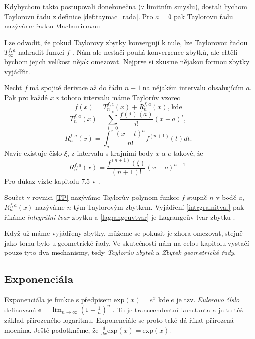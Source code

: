 \begin{remind}
Kdybychom takto postupovali donekonečna (v limitním smyslu), dostali bychom Taylorovu řadu z definice \ref{def:taymac_rada}. Pro $a=0$ pak Taylorovu řadu nazýváme řadou Maclaurinovou.
\end{remind}

Lze odvodit, že pokud Taylorovy zbytky konvergují k nule, lze Taylorovou řadou $T_\infty^{f,a}$ nahradit funkci $f$ \cite{ZDVNNR}. Nám ale nestačí pouhá konvergence zbytků, ale chtěli bychom jejich velikost nějak omezovat. Nejprve si zkusme nějakou formou zbytky vyjádřit.

\begin{fact}
Nechť $f$ má spojité derivace až do řádu $n+1$ na nějakém intervalu obsahujícím $a$. Pak pro každé $x$ z tohoto intervalu máme Taylorův vzorec
\begin{equation}
f(x) = T_n^{f,a}(x) + R_n^{f,a}(x)\text{, kde}
\end{equation}
\begin{equation}\label{TP}
T_n^{f,a}(x) = \sum_{i=0}^{n}\frac{f{(i)}(a)}{i!}(x-a)^i,
\end{equation}
\begin{equation}\label{integralnitvar}
R_n^{f,a}(x)=\int_a^x\frac{(x-t)^n}{n!}f^{(n+1)}(t)dt.
\end{equation}
Navíc existuje číslo $\xi$, z intervalu s krajními body $x$ a $a$ takové, že
\begin{equation}\label{lagrangeuvtvar}
R_n^{f,a}(x)=\frac{f^{(n+1)}(\xi)}{(n+1)!}(x-a)^{n+1}.
\end{equation}
Pro důkaz vizte kapitolu 7.5 v \cite{TMA:Calculus}.
\end{fact}

Součet v rovnici \ref{TP} nazýváme Taylorův polynom funkce $f$ stupně $n$ v bodě $a$, $R_n^{f,a}(x)$ nazýváme $n$-tým Taylorovým zbytkem. Vyjádření \ref{integralnitvar} pak říkáme \textit{integrální tvar} zbytku a \ref{lagrangeuvtvar} je Lagrangeův tvar zbytku \cite{MTTP}.

Když už máme vyjádřeny zbytky, můžeme se pokusit je zhora omezovat, stejně jako tomu bylo u geometrické řady. Ve skutečnosti nám na celou kapitolu vystačí pouze tyto dva mechanismy, tedy \textit{Taylorův zbytek} a \textit{Zbytek geometrické řady}.

\subsection{Exponenciála}
Exponenciála je funkce s předpisem $\mathrm{exp}(x) = e^x$ kde $e$ je tzv. \textit{Eulerovo číslo} definované $e=\lim_{n\to\infty}\left(1+\frac{1}{n}\right)^n$ \cite{EPJVMAI}. To je transcendentní konstanta a je to též základ přirozeného logaritmu. Exponenciále se proto také dá říkat přirozená mocnina. Ještě podotkněme, že $\frac{d}{dx}\mathrm{exp}(x)=\mathrm{exp}(x)$.

